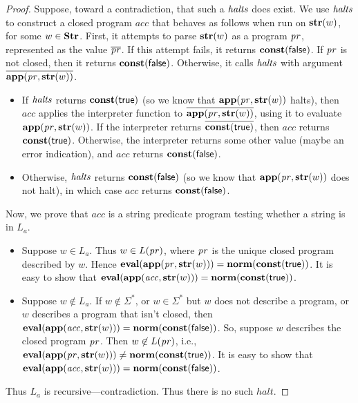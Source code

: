 \begin{proof}
Suppose, toward a contradiction, that such a $\mathit{halts}$ does exist.  We
use $\mathit{halts}$ to construct a closed program $\mathit{acc}$ that behaves as
follows when run on $\mathbf{str}(w)$, for some $w\in\mathbf{Str}$.  First, it
attempts to parse $\mathbf{str}(w)$ as a program $\mathit{pr}$, represented as
the value $\overline{\mathit{pr}}$.  If this attempt fails, it returns
$\mathbf{const}(\mathsf{false})$.  If $\mathit{pr}$ is not closed, then it returns
$\mathbf{const}(\mathsf{false})$.  Otherwise, it calls $\mathit{halts}$ with argument
$\overline{\mathbf{app}(\mathit{pr},\mathbf{str}(w))}$.

\begin{itemize}
\item If $\mathit{halts}$ returns $\mathbf{const}(\mathsf{true})$ (so we know that
  $\mathbf{app}(\mathit{pr},\mathbf{str}(w))$ halts), then $\mathit{acc}$ applies the
  interpreter function to $\overline{\mathbf{app}(\mathit{pr},\mathbf{str}(w))}$,
  using it to evaluate $\mathbf{app}(\mathit{pr},\mathbf{str}(w))$.  If the
  interpreter returns $\overline{\mathbf{const}(\mathsf{true})}$, then
  $\mathit{acc}$ returns $\mathbf{const}(\mathsf{true})$.  Otherwise, the
  interpreter returns some other value (maybe an error indication),
  and $\mathit{acc}$ returns $\mathbf{const}(\mathsf{false})$.

\item Otherwise, $\mathit{halts}$ returns $\mathbf{const}(\mathsf{false})$ (so we know that
  $\mathbf{app}(\mathit{pr},\mathbf{str}(w))$ does not halt), in which case
  $\mathit{acc}$ returns $\mathbf{const}(\mathsf{false})$.
\end{itemize}

Now, we prove that $\mathit{acc}$ is a string predicate program
testing whether a string is in $L_a$.

\begin{itemize}
\item Suppose $w\in L_a$.  Thus $w\in L(\mathit{pr})$, where $\mathit{pr}$ is the
  unique closed program described by $w$.  Hence
  $\mathbf{eval}(\mathbf{app}(\mathit{pr},\mathbf{str}(w))) = \mathbf{norm}(\mathbf{const}(\mathsf{true}))$.  It
  is easy to show that $\mathbf{eval}(\mathbf{app}(\mathit{acc},\mathbf{str}(w))) =
  \mathbf{norm}(\mathbf{const}(\mathsf{true}))$.

\item Suppose $w\not\in L_a$.  If $w\not\in\Sigma^*$, or
  $w\in\Sigma^*$ but $w$ does not describe a program, or $w$ describes
  a program that isn't closed, then $\mathbf{eval}(\mathbf{app}(\mathit{acc},\mathbf{str}(w)))
  = \mathbf{norm}(\mathbf{const}(\mathsf{false}))$.  So, suppose $w$ describes the closed
  program $\mathit{pr}$.  Then $w\not\in L(\mathit{pr})$, i.e.,
  $\mathbf{eval}(\mathbf{app}(\mathit{pr},\mathbf{str}(w))) \neq \mathbf{norm}(\mathbf{const}(\mathsf{true}))$.
  It is easy to show that $\mathbf{eval}(\mathbf{app}(\mathit{acc},\mathbf{str}(w))) =
  \mathbf{norm}(\mathbf{const}(\mathsf{false}))$.
\end{itemize}

Thus $L_a$ is recursive---contradiction.  Thus there is no such
$\mathit{halt}$.
\end{proof}

